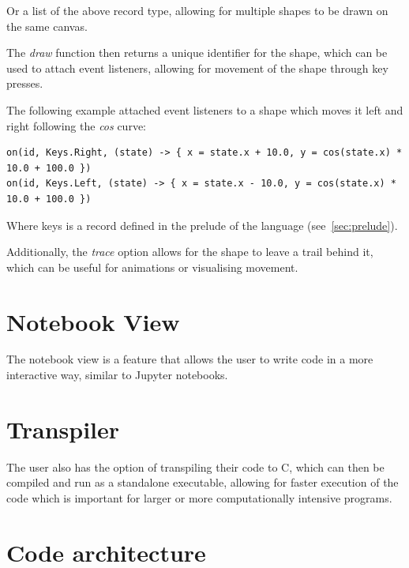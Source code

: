 Or a list of the above record type, allowing for multiple shapes to be drawn on the same canvas.

The \textit{draw} function then returns a unique identifier for the shape, which can be used to attach event 
listeners, allowing for movement of the shape through key presses.

The following example attached event listeners to a shape which moves it left and right following the \textit{cos} curve:

\begin{verbatim}
on(id, Keys.Right, (state) -> { x = state.x + 10.0, y = cos(state.x) * 10.0 + 100.0 })
on(id, Keys.Left, (state) -> { x = state.x - 10.0, y = cos(state.x) * 10.0 + 100.0 })
\end{verbatim}

Where keys is a record defined in the prelude of the language (see~\autoref{sec:prelude}).

Additionally, the \textit{trace} option allows for the shape to leave a trail behind it, which can be useful for
animations or visualising movement.


\section{Notebook View}\label{sec:notebook-view}

The notebook view is a feature that allows the user to write code in a more interactive way, similar to Jupyter
notebooks\citep{Jupyter}.

\section{Transpiler}\label{sec:transpiler}

The user also has the option of transpiling their code to C, which can then be compiled and run as a standalone
executable, allowing for faster execution of the code which is important for larger or more computationally
intensive programs.

\section{Code architecture}\label{sec:code-architecture}